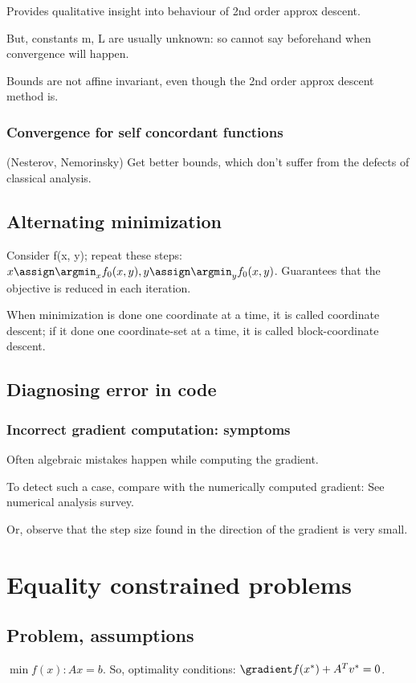\documentclass[oneside, article]{memoir}
\begin{document}
Provides qualitative insight into behaviour of 2nd order approx descent.

But, constants m, L are usually unknown: so cannot say beforehand when convergence will happen.

Bounds are not affine invariant, even though the 2nd order approx descent method is.

\subsection{Convergence for self concordant functions}
(Nesterov, Nemorinsky) Get better bounds, which don't suffer from the defects of classical analysis.

\section{Alternating minimization}
Consider f(x, y); repeat these steps: \\
$x \assign \argmin_x f_0(x, y), y \assign \argmin_y f_0(x, y)$. Guarantees that the objective is reduced in each iteration.

When minimization is done one coordinate at a time, it is called coordinate descent; if it done one coordinate-set at a time, it is called block-coordinate descent.

\section{Diagnosing error in code}
\subsection{Incorrect gradient computation: symptoms}
Often algebraic mistakes happen while computing the gradient.

To detect such a case, compare with the numerically computed gradient: See numerical analysis survey.

Or, observe that the step size found in the direction of the gradient is very small.



\chapter{Equality constrained problems}
\section{Problem, assumptions}
$\min f(x): Ax = b$. So, optimality conditions: $\gradient f(x^{*}) + A^{T}v^{*} = 0$.
\end{document}
